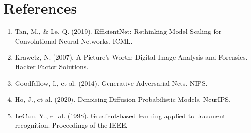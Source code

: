 \documentclass[12pt,a4paper]{article}
\begin{document}
\section*{References}
\begin{enumerate}
    \item Tan, M., \& Le, Q. (2019). EfficientNet: Rethinking Model Scaling for Convolutional Neural Networks. ICML.
    \item Krawetz, N. (2007). A Picture's Worth: Digital Image Analysis and Forensics. Hacker Factor Solutions.
    \item Goodfellow, I., et al. (2014). Generative Adversarial Nets. NIPS.
    \item Ho, J., et al. (2020). Denoising Diffusion Probabilistic Models. NeurIPS.
    \item LeCun, Y., et al. (1998). Gradient-based learning applied to document recognition. Proceedings of the IEEE.
\end{enumerate}
\end{document}
